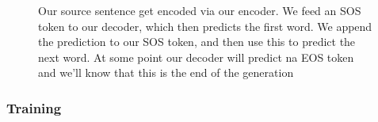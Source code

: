 \documentclass[11pt]{article}
\begin{document}
\begin{figure}[H]
    \centering
    \caption*{Our source sentence get encoded via our encoder. We feed an SOS token to our decoder, which then predicts the first word. We append the prediction to our SOS token, and then use this to predict the next word. At some point our decoder will predict na EOS token and we'll know that this is the end of the generation}
\end{figure}

\subsubsection{Training}
\end{document}
